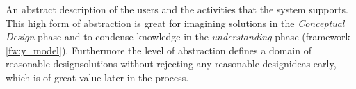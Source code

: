 \begin{tool} \label{tool:conceptual_scenario} 
  An abstract description of the users and the activities that the system supports. This high form of abstraction is great for imagining solutions in the \emph{Conceptual Design} phase and to condense knowledge in the \emph{understanding} phase (framework \ref{fw:y_model}). Furthermore the level of abstraction defines a domain of reasonable designsolutions without rejecting any reasonable designideas early, which is of great value later in the process. \cite[p. 63]{benyon_14}
\end{tool}
